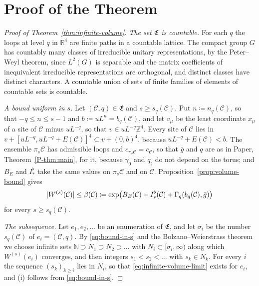 \documentclass[11pt]{preprint}
\DeclarePairedDelimiter{\abs}{\lvert}{\rvert}
\numberwithin{equation}{section}
\theoremstyle{definition}
\theoremstyle{remark}
\theoremstyle{plain}
\begin{document}
\section{Proof of the Theorem}\label{sec:proof}

\begin{proof}[Proof of Theorem~\ref{thm:infinite-volume}]
\emph{The set $\mathfrak E$ is countable.} For each $q$ the loops at level $q$ in $\mathbb R^4$ are finite paths in a countable lattice. The compact group $G$ has countably many classes of irreducible unitary representations, by the Peter--Weyl theorem, since $L^2(G)$ is separable and the matrix coefficients of inequivalent irreducible representations are orthogonal, and distinct classes have distinct characters. A countable union of sets of finite families of elements of countable sets is countable.

\emph{A bound uniform in $s$.} Let $(\mathcal C, q) \in \mathfrak E$ and $s \geq s_q(\mathcal C)$. Put $n \coloneqq n_q(\mathcal C)$, so that $-q \leq n \leq s - 1$ and $b \coloneqq uL^n = b_q(\mathcal C)$, and let $v_\mu$ be the least coordinate $x_\mu$ of a site of $\mathcal C$ minus $uL^{-q}$, so that $v \in uL^{-q}\mathbb Z^4$. Every site of $\mathcal C$ lies in $v + [uL^{-q}, uL^{-q} + E(\mathcal C)]^4 \subset v + (0, b)^4$, because $uL^{-q} + E(\mathcal C) < b$. The ensemble $\pi_s\mathcal C$ has admissible loops and $c_{\pi_s\mathcal C} = c_{\mathcal C}$, so that $\bar g$ and $q$ are as in Paper, Theorem~\ref{P-thm:main}, for it, because $\gamma_0$ and $q_\sharp$ do not depend on the torus; and $B_E$ and $I^\flat_*$ take the same values on $\pi_s\mathcal C$ and on $\mathcal C$. Proposition~\ref{prop:volume-bound} gives
\begin{equation}\label{eq:bound-in-s}
    \abs{W^{(s)}(\mathcal C)} \leq \beta(\mathcal C) \coloneqq \exp\bigl(B_E(\mathcal C) + I^\flat_*(\mathcal C) + \Gamma_q(b_q(\mathcal C), \bar g)\bigr)
\end{equation}
for every $s \geq s_q(\mathcal C)$.

\emph{The subsequence.} Let $e_1, e_2, \dots$ be an enumeration of $\mathfrak E$, and let $\sigma_i$ be the number $s_q(\mathcal C)$ of $e_i = (\mathcal C, q)$. By \eqref{eq:bound-in-s} and the Bolzano--Weierstrass theorem we choose infinite sets $\mathbb N \supset N_1 \supset N_2 \supset \dots$ with $N_i \subset [\sigma_i, \infty)$ along which $W^{(s)}(e_i)$ converges, and then integers $s_1 < s_2 < \dots$ with $s_k \in N_k$. For every $i$ the sequence $(s_k)_{k \geq i}$ lies in $N_i$, so that \eqref{eq:infinite-volume-limit} exists for $e_i$, and (i) follows from \eqref{eq:bound-in-s}.


\end{proof}
\end{document}
